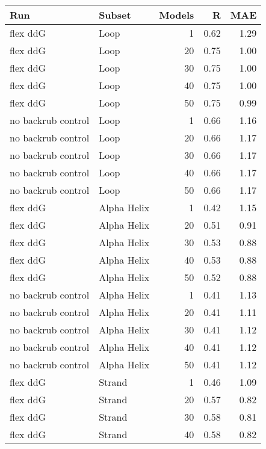 \begin{table}
\begin{tabular}{llrrr}
\toprule
                Run &       Subset &  Models &    R &  MAE \\
\midrule
           flex ddG &         Loop &       1 & 0.62 & 1.29 \\
           flex ddG &         Loop &      20 & 0.75 & 1.00 \\
           flex ddG &         Loop &      30 & 0.75 & 1.00 \\
           flex ddG &         Loop &      40 & 0.75 & 1.00 \\
           flex ddG &         Loop &      50 & 0.75 & 0.99 \\
 no backrub control &         Loop &       1 & 0.66 & 1.16 \\
 no backrub control &         Loop &      20 & 0.66 & 1.17 \\
 no backrub control &         Loop &      30 & 0.66 & 1.17 \\
 no backrub control &         Loop &      40 & 0.66 & 1.17 \\
 no backrub control &         Loop &      50 & 0.66 & 1.17 \\
           flex ddG &  Alpha Helix &       1 & 0.42 & 1.15 \\
           flex ddG &  Alpha Helix &      20 & 0.51 & 0.91 \\
           flex ddG &  Alpha Helix &      30 & 0.53 & 0.88 \\
           flex ddG &  Alpha Helix &      40 & 0.53 & 0.88 \\
           flex ddG &  Alpha Helix &      50 & 0.52 & 0.88 \\
 no backrub control &  Alpha Helix &       1 & 0.41 & 1.13 \\
 no backrub control &  Alpha Helix &      20 & 0.41 & 1.11 \\
 no backrub control &  Alpha Helix &      30 & 0.41 & 1.12 \\
 no backrub control &  Alpha Helix &      40 & 0.41 & 1.12 \\
 no backrub control &  Alpha Helix &      50 & 0.41 & 1.12 \\
           flex ddG &       Strand &       1 & 0.46 & 1.09 \\
           flex ddG &       Strand &      20 & 0.57 & 0.82 \\
           flex ddG &       Strand &      30 & 0.58 & 0.81 \\
           flex ddG &       Strand &      40 & 0.58 & 0.82 \\

\end{tabular}
\end{table}
